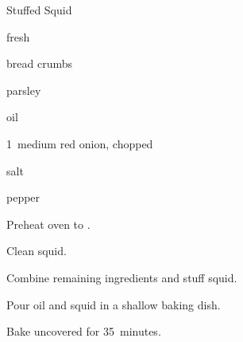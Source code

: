 \begin{recipe}{Stuffed Squid\UNTESTED}{}{}

\begin{ingredients}
\item {} fresh 
\item \C{2\half} bread crumbs
\item {} parsley
\item {} 
\item {} oil
\item 1~medium red onion, chopped
\item salt
\item pepper
\end{ingredients}

\begin{directions}
\item Preheat oven to .
\item Clean squid.
\item Combine remaining ingredients and stuff squid.
\item Pour \C{\half} oil and squid in a shallow baking dish.
\item Bake uncovered for 35~minutes.
\end{directions}

\end{recipe}
